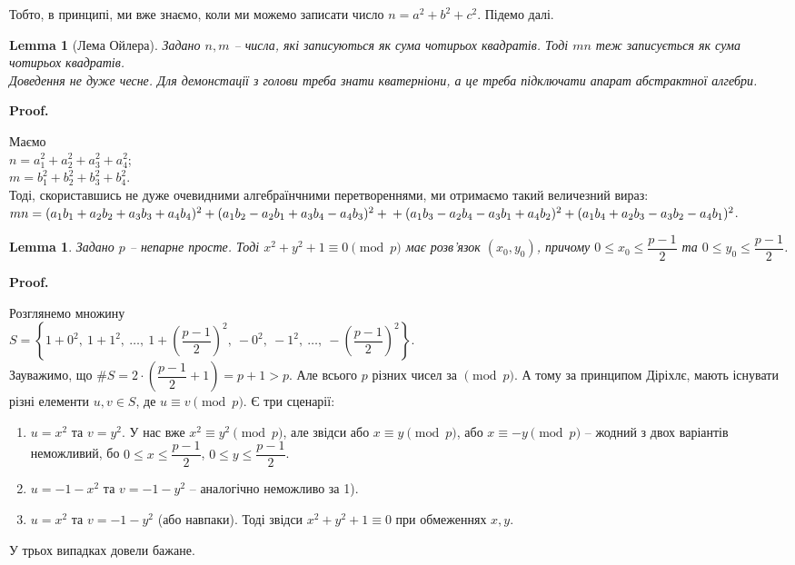 \documentclass[a4paper, 10pt]{article}
\makeatletter
\theoremstyle{theoremdd}
\theoremstyle{theoremdd}
\theoremstyle{theoremdd}
\theoremstyle{theoremdd}
\theoremstyle{theoremdd}
\theoremstyle{theoremdd}
\theoremstyle{theoremdd}
\newtheorem{lemma}[theorem]{Lemma}
\theoremstyle{theoremdd}
\renewenvironment{proof}[1][Proof.\\]{\par
\pushQED{\hfill \qed}%
\normalfont \topsep6\p@\@plus6\p@\relax
\trivlist
\item\relax
{\bfseries
#1\@addpunct{.}}\hspace\labelsep\ignorespaces
}{%
\popQED\endtrivlist\@endpefalse
}
\makeatother
\begin{document}
Тобто, в принципі, ми вже знаємо, коли ми можемо записати число $n = a^2+b^2+c^2$. Підемо далі.

\begin{lemma}[Лема Ойлера]
Задано $n,m$ -- числа, які записуються як сума чотирьох квадратів. Тоді $mn$ теж записується як сума чотирьох квадратів.\\
\textit{Доведення не дуже чесне. Для демонстації з голови треба знати кватерніони, а це треба підключати апарат абстрактної алгебри.}
\end{lemma}

\begin{proof}
Маємо\\
$n = a_1^2+a_2^2+a_3^2+a_4^2$;\\
$m = b_1^2+b_2^2+b_3^2+b_4^2$.\\
Тоді, скориставшись не дуже очевидними алгебраїнчними перетвореннями, ми отримаємо такий величезний вираз:\\
$mn = (a_1b_1+a_2b_2+a_3b_3+a_4b_4)^2 + (a_1b_2-a_2b_1+a_3b_4-a_4b_3)^2 + \\ + (a_1b_3-a_2b_4-a_3b_1+a_4b_2)^2 + (a_1b_4+a_2b_3-a_3b_2-a_4b_1)^2$.
\end{proof}

\begin{lemma}
Задано $p$ -- непарне просте. Тоді $x^2+y^2+1 \equiv 0 \pmod p$ має розв'язок $(x_0,y_0)$, причому $0 \leq x_0 \leq \dfrac{p-1}{2}$ та $0 \leq y_0 \leq \dfrac{p-1}{2}$.
\end{lemma}

\begin{proof}
Розглянемо множину \\ $S = \left\{ 1+0^2,\ 1+1^2,\ \dots,\ 1+ \left( \dfrac{p-1}{2} \right)^2,\  -0^2,\ -1^2,\ \dots,\ -\left( \dfrac{p-1}{2} \right)^2 \right\}$.\\
Зауважимо, що $\# S = 2 \cdot \left( \dfrac{p-1}{2} +1 \right) = p+1 > p$. Але всього $p$ різних чисел за $\!\! \pmod p$. А тому за принципом Діріхлє, мають існувати різні елементи $u,v \in S$, де $u \equiv v \pmod p$. Є три сценарії:
\begin{enumerate}[nosep,wide=0pt,label={\Roman*.}]
\item $u = x^2$ та $v = y^2$. У нас вже $x^2 \equiv y^2 \pmod p$, але звідси або $x \equiv y \pmod p$, або $x \equiv -y \pmod p$ -- жодний з двох варіантів неможливий, бо $0 \leq x \leq \dfrac{p-1}{2}$, $0 \leq y \leq \dfrac{p-1}{2}$.
\item $u = -1-x^2$ та $v = -1-y^2$ -- аналогічно неможливо за 1).
\item $u = x^2$ та $v = -1-y^2$ (або навпаки). Тоді звідси $x^2+y^2+1 \equiv 0$ при обмеженнях $x,y$.
\end{enumerate}
У трьох випадках довели бажане.
\end{proof}
\end{document}
